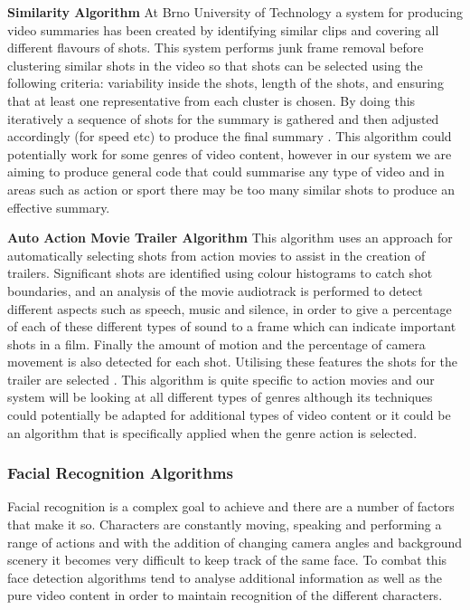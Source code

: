 \textbf{Similarity Algorithm}
\newline
At Brno University of Technology a system for producing video summaries has been created by identifying similar clips and covering all different flavours of shots. This system performs junk frame removal before clustering similar shots in the video so that shots can be selected using the following criteria: variability inside the shots, length of the shots, and ensuring that at least one representative from each cluster is chosen. By doing this iteratively a sequence of shots for the summary is gathered and then adjusted accordingly (for speed etc) to produce the final summary \cite{BrnoSummarisation}. This algorithm could potentially work for some genres of video content, however in our system we are aiming to produce general code that could summarise any type of video and in areas such as action or sport there may be too many similar shots to produce an effective summary. 

\textbf{Auto Action Movie Trailer Algorithm}
\newline
This algorithm uses an approach for automatically selecting shots from action movies to assist in the creation of trailers. Significant 
shots are identified using colour histograms to catch shot boundaries, and an analysis of the movie audiotrack is performed to detect different aspects 
such as speech, music and silence, in order to give a percentage of each of these different types of sound to a frame which can indicate important 
shots in a film. Finally the amount of motion and the percentage of camera movement is also detected for each shot. Utilising these features 
the shots for the trailer are selected \cite{AutoActionTrailers}. This algorithm is quite specific to action movies and our system will be 
looking at all different types of genres although its techniques could potentially be adapted for additional types of video content or it 
could be an algorithm that is specifically applied when the genre action is selected. 

\subsubsection{Facial Recognition Algorithms}
\label{sec:FacialRecognition}
Facial recognition is a complex goal to achieve and there are a number of factors that make it so. Characters are constantly moving, speaking and performing a range of actions and with the addition of changing camera angles and background scenery it becomes very difficult to keep track of the same face. To combat this face detection algorithms tend to analyse additional information as well as the pure video content in order to maintain recognition of the different characters. 

